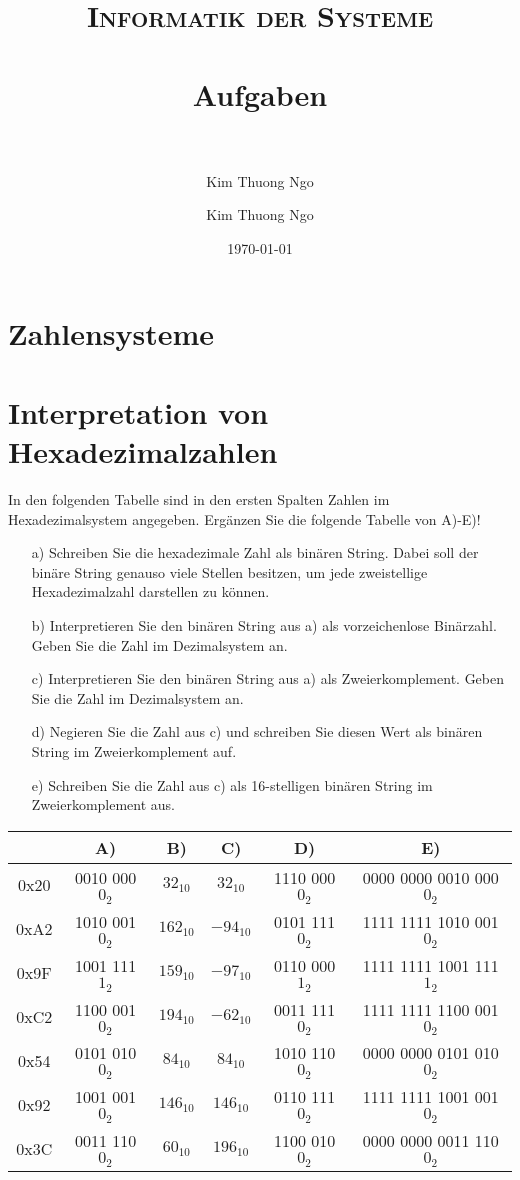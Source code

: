 \documentclass[paper=a4, fontsize=11pt]{scrartcl}
\author{Kim Thuong Ngo}
\title{	
\normalfont \normalsize 
\textsc{Informatik der Systeme} \\ [25pt] 
\horrule{0.5pt} \\[0.4cm] 
\huge Aufgaben \\ 
\horrule{2pt} \\[0.5cm] 
}
\author{Kim Thuong Ngo}
\date{\normalsize\today}
\numberwithin{equation}{section}
\numberwithin{figure}{section}
\numberwithin{table}{section}
\begin{document}
\maketitle 

\newpage

\tableofcontents

\newpage

\section{Zahlensysteme}
\section{Interpretation von Hexadezimalzahlen}
In den folgenden Tabelle sind in den ersten Spalten Zahlen im Hexadezimalsystem angegeben. Ergänzen Sie die folgende Tabelle von A)-E)! \\

\begin{itemize}
\item[a)] Schreiben Sie die hexadezimale Zahl als binären String. Dabei soll der binäre String genauso viele Stellen besitzen, um jede zweistellige Hexadezimalzahl darstellen zu können.
\item[b)] Interpretieren Sie den binären String aus a) als vorzeichenlose Binärzahl. Geben Sie die Zahl im Dezimalsystem an.
\item[c)] Interpretieren Sie den binären String aus a) als Zweierkomplement. Geben Sie die Zahl im Dezimalsystem an. 
\item[d)] Negieren Sie die Zahl aus c) und schreiben Sie diesen Wert als binären String im Zweierkomplement auf. 
\item[e)] Schreiben Sie die Zahl aus c) als 16-stelligen binären String im Zweierkomplement aus.
\end{itemize}

\begin{tabular}{|c|c|c|c|c|c|}
\hline
& A) & B) & C) & D) & E) \\
\hline
0x20 & 0010 000$0_{2}$ & $32_{10}$ & $32_{10}$ & 1110 000$0_{2}$ & 0000 0000 0010 000$0_{2}$ \\
\hline
0xA2 & 1010 001$0_{2}$ & $162_{10}$ & $-94_{10}$ & 0101 111$0_{2}$ & 1111 1111 1010 001$0_{2}$ \\
\hline
0x9F & 1001 111$1_{2}$ & $159_{10}$ & $-97_{10}$ & 0110 000$1_{2}$ & 1111 1111 1001 111$1_{2}$ \\
\hline
0xC2 & 1100 001$0_{2}$ & $194_{10}$ & $-62_{10}$ & 0011 111$0_{2}$ & 1111 1111 1100 001$0_{2}$ \\
\hline
0x54 & 0101 010$0_{2}$ & $84_{10}$ & $84_{10}$ & 1010 110$0_{2}$ & 0000 0000 0101 010$0_{2}$ \\
\hline
0x92 & 1001 001$0_{2}$ & $146_{10}$ & $146_{10}$ & 0110 111$0_{2}$ & 1111 1111 1001 001$0_{2}$ \\
\hline
0x3C & 0011 110$0_{2}$ & $60_{10}$ & $196_{10}$ & 1100 010$0_{2}$ & 0000 0000 0011 110$0_{2}$ \\
\hline
\end{tabular} \\
\end{document}
